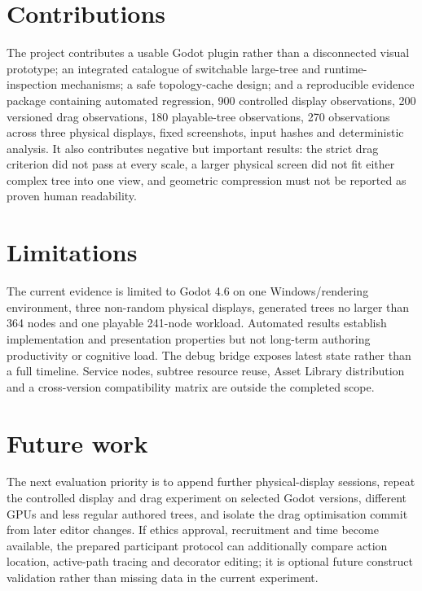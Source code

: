 \section{Contributions}

The project contributes a usable Godot plugin rather than a disconnected visual prototype; an integrated catalogue of switchable large-tree and runtime-inspection mechanisms; a safe topology-cache design; and a reproducible evidence package containing automated regression, 900 controlled display observations, 200 versioned drag observations, 180 playable-tree observations, 270 observations across three physical displays, fixed screenshots, input hashes and deterministic analysis. It also contributes negative but important results: the strict drag criterion did not pass at every scale, a larger physical screen did not fit either complex tree into one view, and geometric compression must not be reported as proven human readability.

\section{Limitations}

The current evidence is limited to Godot 4.6 on one Windows/rendering environment, three non-random physical displays, generated trees no larger than 364 nodes and one playable 241-node workload. Automated results establish implementation and presentation properties but not long-term authoring productivity or cognitive load. The debug bridge exposes latest state rather than a full timeline. Service nodes, subtree resource reuse, Asset Library distribution and a cross-version compatibility matrix are outside the completed scope.

\section{Future work}

The next evaluation priority is to append further physical-display sessions, repeat the controlled display and drag experiment on selected Godot versions, different GPUs and less regular authored trees, and isolate the drag optimisation commit from later editor changes. If ethics approval, recruitment and time become available, the prepared participant protocol can additionally compare action location, active-path tracing and decorator editing; it is optional future construct validation rather than missing data in the current experiment.

